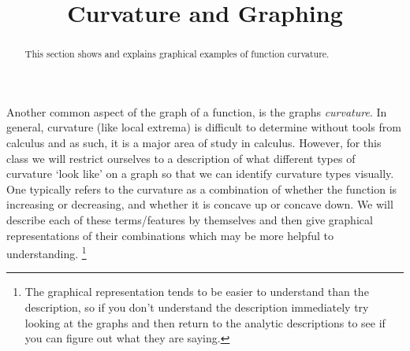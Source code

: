 \documentclass{ximera}
\title{Curvature and Graphing}
\begin{document}
\begin{abstract}
    This section shows and explains graphical examples of function curvature.
\end{abstract}
\maketitle


Another common aspect of the graph of a function, is the graphs \textit{curvature}. In general, curvature (like local extrema) is difficult to determine without tools from calculus and as such, it is a major area of study in calculus. However, for this class we will restrict ourselves to a description of what different types of curvature `look like' on a graph so that we can identify curvature types visually. \\

One typically refers to the curvature as a combination of whether the function is increasing or decreasing, and whether it is concave up or concave down. We will describe each of these terms/features by themselves and then give graphical representations of their combinations which may be more helpful to understanding.%
\footnote{The graphical representation tends to be easier to understand than the description, so if you don't understand the description immediately try looking at the graphs and then return to the analytic descriptions to see if you can figure out what they are saying.}
\end{document}

